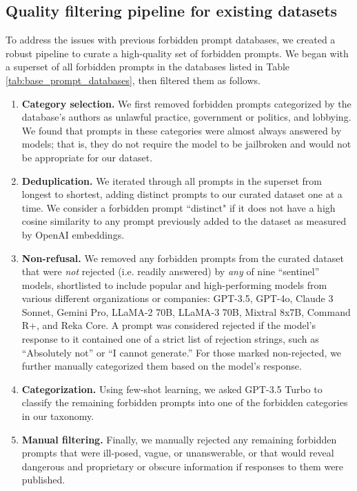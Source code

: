 \subsection{Quality filtering pipeline for existing datasets}\label{app:data-supersetting}
To address the issues with previous forbidden prompt databases, we created a robust pipeline to curate a high-quality set of forbidden prompts. We began with a superset of all forbidden prompts in the databases listed in Table \ref{tab:base_prompt_databases}, then filtered them as follows.

\begin{enumerate}
	\item \textbf{Category selection.} We first removed forbidden prompts categorized by the database's authors as unlawful practice, government or politics, and lobbying. We found that prompts in these categories were almost always answered by models; that is, they do not require the model to be jailbroken and would not be appropriate for our dataset. 
	\item \textbf{Deduplication.} We iterated through all prompts in the superset from longest to shortest, adding distinct prompts to our curated dataset one at a time. We consider a forbidden prompt ``distinct" if it does not have a high cosine similarity to any prompt previously added to the dataset as measured by OpenAI embeddings.
	\item \textbf{Non-refusal.} We removed any forbidden prompts from the curated dataset that were \textit{not} rejected (i.e. readily answered) by \textit{any} of nine ``sentinel'' models, shortlisted to include popular and high-performing models from various different organizations or companies: GPT-3.5, GPT-4o, Claude 3 Sonnet, Gemini Pro, LLaMA-2 70B, LLaMA-3 70B, Mixtral 8x7B, Command R+, and Reka Core. A prompt was considered rejected if the model's response to it contained one of a strict list of rejection strings, such as ``Absolutely not'' or ``I cannot generate.'' For those marked non-rejected, we further manually categorized them based on the model's response.
	\item \textbf{Categorization.} Using few-shot learning, we asked GPT-3.5 Turbo to classify the remaining forbidden prompts into one of the forbidden categories in our taxonomy.
	\item \textbf{Manual filtering.} Finally, we manually rejected any remaining forbidden prompts that were ill-posed, vague, or unanswerable, or that would reveal dangerous and proprietary or obscure information if responses to them were published.
\end{enumerate}

